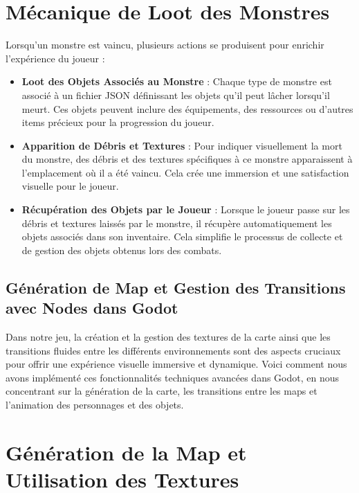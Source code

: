 \section*{Mécanique de Loot des Monstres}

Lorsqu'un monstre est vaincu, plusieurs actions se produisent pour enrichir l'expérience du joueur :
\\
\begin{itemize}
    \item \textbf{Loot des Objets Associés au Monstre} : Chaque type de monstre est associé à un fichier JSON définissant les objets qu'il peut lâcher lorsqu'il meurt. Ces objets peuvent inclure des équipements, des ressources ou d'autres items précieux pour la progression du joueur.
    \\

    \item \textbf{Apparition de Débris et Textures} : Pour indiquer visuellement la mort du monstre, des débris et des textures spécifiques à ce monstre apparaissent à l'emplacement où il a été vaincu. Cela crée une immersion et une satisfaction visuelle pour le joueur.
    \\

    \item \textbf{Récupération des Objets par le Joueur} : Lorsque le joueur passe sur les débris et textures laissés par le monstre, il récupère automatiquement les objets associés dans son inventaire. Cela simplifie le processus de collecte et de gestion des objets obtenus lors des combats.
\end{itemize}




\subsection{Génération de Map et Gestion des Transitions avec Nodes dans Godot}




Dans notre jeu, la création et la gestion des textures de la carte ainsi que les transitions fluides entre les différents environnements sont
 des aspects cruciaux pour offrir une expérience visuelle immersive et dynamique. Voici comment nous avons implémenté ces fonctionnalités techniques 
 avancées dans Godot, en nous concentrant sur la génération de la carte, les transitions entre les maps et l'animation des personnages et des objets.

\section*{Génération de la Map et Utilisation des Textures}

